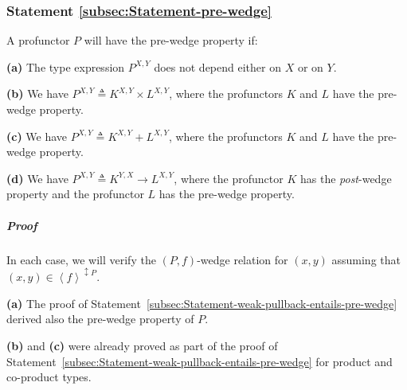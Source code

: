 \subsubsection{Statement \label{subsec:Statement-pre-wedge}\ref{subsec:Statement-pre-wedge}}

A profunctor $P$ will have the pre-wedge property if:

\textbf{(a)} The type expression $P^{X,Y}$ does not depend either
on $X$ or on $Y$.

\textbf{(b)} We have $P^{X,Y}\triangleq K^{X,Y}\times L^{X,Y}$, where
the profunctors $K$ and $L$ have the pre-wedge property.

\textbf{(c)} We have $P^{X,Y}\triangleq K^{X,Y}+L^{X,Y}$, where the
profunctors $K$ and $L$ have the pre-wedge property.

\textbf{(d)} We have $P^{X,Y}\triangleq K^{Y,X}\rightarrow L^{X,Y}$,
where the profunctor $K$ has the \emph{post}-wedge property and the
profunctor $L$ has the pre-wedge property.

\begin{comment}
\textbf{(e)} We have a recursive type $P^{X,Y}\triangleq S^{X,Y,P^{X,Y}}$,
where $S^{X,Y,R}$ is contravariant in $X$ and covariant in $Y$
and $R$, and has the pre-wedge property when viewed as a profunctor
with respect to $X$ and $Y$. \textendash{} Not sure if this is correct.
\end{comment}


\subparagraph{Proof}

In each case, we will verify the $\left(P,f\right)$-wedge relation
for $(x,y)$ assuming that $(x,y)\in\left<f\right>^{\updownarrow P}$. 

\textbf{(a)} The proof of Statement~\ref{subsec:Statement-weak-pullback-entails-pre-wedge}
derived also the pre-wedge property of $P$.

\textbf{(b)} and \textbf{(c)} were already proved as part of the proof
of Statement~\ref{subsec:Statement-weak-pullback-entails-pre-wedge}
for product and co-product types.


